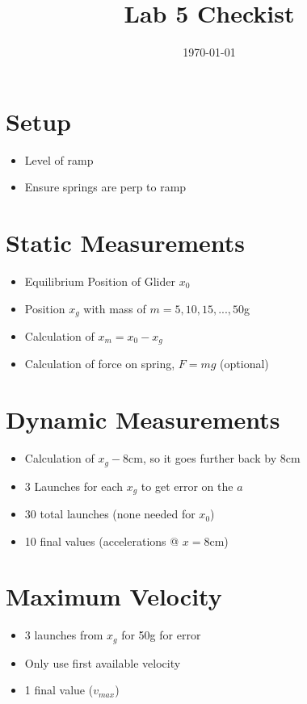 \documentclass[12pt]{article}
\title{\vspace{-3em}Lab 5 Checkist}
\date{\today}
\begin{document}
\maketitle

\section{Setup}
\begin{itemize}
\item Level of ramp
\item Ensure springs are perp to ramp
\end{itemize}

\section{Static Measurements}
\begin{itemize}
\item Equilibrium Position of Glider $x_0$
\item Position $x_g$ with mass of $m=5,10,15,...,50$g
\item Calculation of $x_m=x_0-x_g$ 
\item Calculation of force on spring, $F=mg$ (optional)
\end{itemize}

\section{Dynamic Measurements}
\begin{itemize}
\item Calculation of $x_g-8$cm, so it goes further back by $8$cm
\item 3 Launches for each $x_g$ to get error on the $a$
\item 30 total launches (none needed for $x_0$)
\item 10 final values (accelerations @ $x=8$cm)
\end{itemize}

\section{Maximum Velocity}
\begin{itemize}
\item 3 launches from $x_g$ for 50g for error
\item Only use first available velocity
\item 1 final value ($v_{max}$)
\end{itemize}
\end{document}
